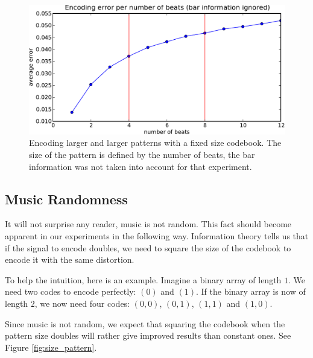 \documentclass{article}
\begin{document}
\begin{figure}[htb]
\begin{center}
\includegraphics[width=.9\columnwidth]{encoding_per_beat}
\end{center}
\caption{\small{Encoding larger and larger patterns with a fixed size
codebook. The size of the pattern is defined by the number of beats,
the bar information was not taken into account for that experiment.
}}
\label{fig:perbeat}
\end{figure}


\iffalse
\subsection{Music Randomness}\label{ssec:random}
It will not surprise any reader, music is not random. This fact should
become apparent in our experiments in the following way. Information
theory tells us that if the signal to encode doubles, we need to square
the size of the codebook to encode it with the same distortion.

To help the intuition, here is an example. Imagine a binary array of 
length $1$. We need two
codes to encode perfectly: $(0)$ and $(1)$. If the binary array is now of
length $2$, we now need four codes: $(0,0)$, $(0,1)$, $(1,1)$ and $(1,0)$.

Since music is not random, we expect that squaring the codebook when the
pattern size doubles will rather give improved results than constant ones.
See Figure \ref{fig:size_pattern}.
\end{document}
